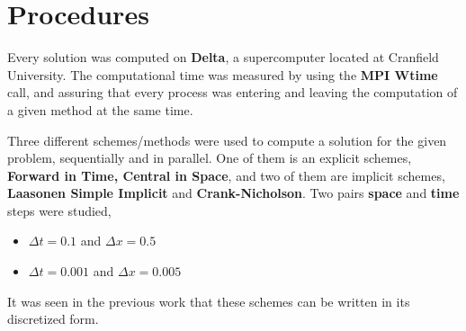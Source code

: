 \documentclass[12pt]{article}
\begin{document}
\section*{Procedures}

\par Every solution was computed on \textbf{Delta}, a supercomputer located at Cranfield University. The computational time was measured by using the \textbf{MPI Wtime} call, and assuring that every process was entering and leaving the computation of a given method at the same time. 
\par Three different schemes/methods were used to compute a solution for the given problem, sequentially and in parallel. One of them is an explicit schemes, \textbf{Forward in Time, Central in Space}, and two of them are implicit schemes, \textbf{Laasonen Simple Implicit} and \textbf{Crank-Nicholson}. Two pairs \textbf{space} and \textbf{time} steps were studied,
\begin{itemize}[noitemsep] 
\item $ \Delta t = 0.1 $ and $ \Delta x = 0.5$
\item $ \Delta t = 0.001 $ and $ \Delta x = 0.005$
\end{itemize}
It was seen in the previous work\cite{fraga} that these schemes can be written in its discretized form.
\end{document}
